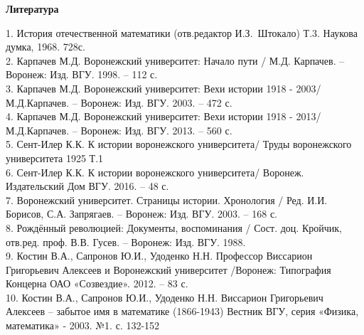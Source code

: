 \begin{center}{\bf Литература}
\end{center}
1. История отечественной математики (отв.редактор И.З.~Штокало) Т.3. Наукова думка, 1968. 728с.\\
2. Карпачев М.Д. Воронежский университет: Начало пути / М.Д. Карпачев. – Воронеж: Изд. ВГУ. 1998. – 112 с.\\
3. Карпачев М.Д. Воронежский университет: Вехи истории 1918 - 2003/ М.Д.Карпачев. – Воронеж: Изд. ВГУ. 2003. – 472 с.\\
4. Карпачев М.Д. Воронежский университет: Вехи истории 1918 - 2013/ М.Д.Карпачев. – Воронеж: Изд. ВГУ. 2013. – 560 с.\\
5. Сент-Илер К.К. К истории воронежского университета/ Труды воронежского университета 1925 Т.1\\
6. Сент-Илер К.К. К истории воронежского университета/ Воронеж. Издательский Дом ВГУ. 2016. – 48 с.\\
7. Воронежский университет. Страницы истории. Хронология / Ред. И.И. Борисов, С.А. Запрягаев. – Воронеж: Изд. ВГУ. 2003. – 168 с.\\
8. Рождённый революцией: Документы, воспоминания / Сост. доц. Кройчик, отв.ред. проф. В.В. Гусев. – Воронеж: Изд. ВГУ. 1988.\\
9. Костин В.А., Сапронов Ю.И., Удоденко Н.Н. Профессор Виссарион Григорьевич Алексеев и Воронежский университет /Воронеж: Типография Концерна ОАО «Созвездие». 2012. –  83 с.\\
10. Костин В.А., Сапронов Ю.И., Удоденко Н.Н. Виссарион Григорьевич Алексеев – забытое имя в математике (1866-1943) Вестник ВГУ, серия «Физика, математика» - 2003. №1.  с. 132-152\\



